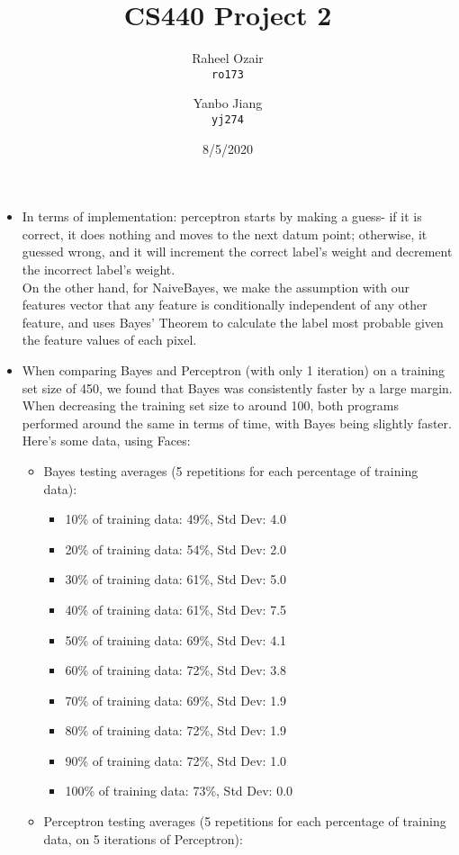 \documentclass[11pt]{article}
\title{CS440 Project 2}
\date{8/5/2020}
\author{
	Raheel Ozair\\
	\texttt{ro173}
	\and
	Yanbo Jiang\\
	\texttt{yj274}
}
\begin{document}
	\maketitle
	\newpage
	\begin{itemize}
		\item In terms of implementation: perceptron starts by making a guess- if it is correct, it does nothing and moves to the next datum point; otherwise, it guessed wrong, and it will increment the correct label's weight and decrement the incorrect label's weight.
		\\ 
		On the other hand, for NaiveBayes, we make the assumption with our features vector that any feature is conditionally independent of any other feature, and uses Bayes' Theorem to calculate the label most probable given the feature values of each pixel.
		\item When comparing Bayes and Perceptron (with only 1 iteration) on a training set size of 450, we found that Bayes was consistently faster by a large margin. When decreasing the training set size to around 100, both programs performed around the same in terms of time, with Bayes being slightly faster. Here's some data, using Faces:
		\begin{itemize}
			\item Bayes testing averages (5 repetitions for each percentage of training data):
			\begin{itemize}
				\item 10\% of training data: 49\%, Std Dev: 4.0
				\item 20\% of training data: 54\%, Std Dev: 2.0
				\item 30\% of training data: 61\%, Std Dev: 5.0
				\item 40\% of training data: 61\%, Std Dev: 7.5
				\item 50\% of training data: 69\%, Std Dev: 4.1 
				\item 60\% of training data: 72\%, Std Dev: 3.8
				\item 70\% of training data: 69\%, Std Dev: 1.9
 				\item 80\% of training data: 72\%, Std Dev: 1.9 
				\item 90\% of training data: 72\%, Std Dev: 1.0
				\item 100\% of training data: 73\%, Std Dev: 0.0
			\end{itemize}
			\item Perceptron testing averages (5 repetitions for each percentage of training data, on 5 iterations of Perceptron):

\end{itemize}
\end{itemize}
\end{document}
